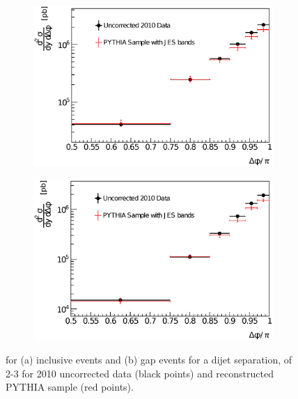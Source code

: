 \begin{figure}
\centering
        \begin{subfigure}[b]{0.5\textwidth}
                \centering
                \includegraphics[width=\textwidth]{figures/GBJ2/ControlPlots/Smeared__dPhi__2_3.eps}
        \end{subfigure}%
        \begin{subfigure}[b]{0.5\textwidth}
                \centering
                \includegraphics[width=\textwidth]{figures/GBJ2/ControlPlots/Smeared__dPhi_gap__2_3.eps}
        \end{subfigure}%
\caption[Comparison of the data and PYTHIA for \dphidyDist{} with $2<\dy{}<3$]{
\dphidyDist{} for (a) inclusive events and (b) gap events for a dijet separation, \dy{} of 2-3 for 2010 uncorrected data (black points) and reconstructed PYTHIA sample (red points).
\label{GBJ2:Uncorr:dphi23}}
\end{figure}


